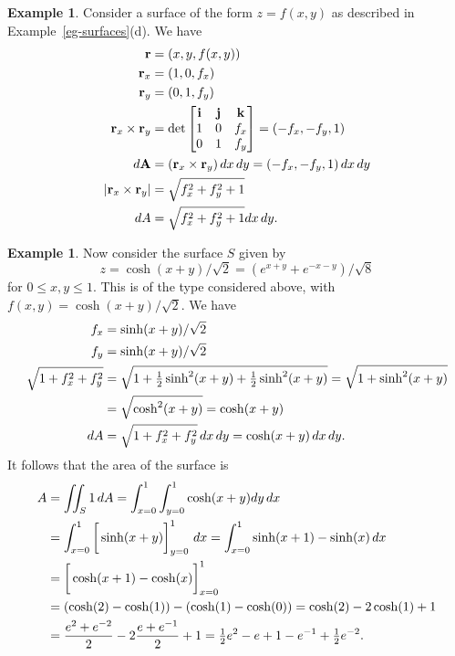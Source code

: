 \documentclass[reqno]{amsart}
\theoremstyle{definition}
\newtheorem{example}[theorem]{Example}
\begin{document}
\begin{example}\label{eg-graph-area}
 Consider a surface of the form $z=f(x,y)$ as described in
 Example~\ref{eg-surfaces}(d).  We have
 \begin{align*}
  \mathbf{r} &= (x,y,f(x,y)) \\
  \mathbf{r}_x &= (1,0,f_x) \\
  \mathbf{r}_y &= (0,1,f_y) \\
  \mathbf{r}_x\times\mathbf{r}_y &= 
   \det\left[\begin{matrix} \mathbf{i} & \mathbf{j} & \mathbf{k} \\
     1 & 0 & f_x \\
     0 & 1 & f_y  
   \end{matrix}\right] = (-f_x,-f_y,1) \\
  d\mathbf{A} &= (\mathbf{r}_x\times\mathbf{r}_y)\,dx\,dy = (-f_x,-f_y,1)\,dx\,dy \\
  |\mathbf{r}_x\times\mathbf{r}_y| &= \sqrt{f_x^2+f_y^2+1} \\
  dA &= \sqrt{f_x^2+f_y^2+1} dx\,dy.
 \end{align*}
\end{example}
\begin{example}
 Now consider the surface $S$ given by 
 \[ z=\cosh(x+y)/\sqrt{2} = (e^{x+y}+e^{-x-y})/\sqrt{8} \] for
 $0\leq x,y\leq 1$.  This is of the type considered above, with
 $f(x,y)=\cosh(x+y)/\sqrt{2}$.  We have
 \begin{align*}
  f_x &= \sinh(x+y)/\sqrt{2} \\
  f_y &= \sinh(x+y)/\sqrt{2} \\
  \sqrt{1+f_x^2+f_y^2} 
   &= \sqrt{1+\tfrac{1}{2}\sinh^2(x+y)+\tfrac{1}{2}\sinh^2(x+y)}
    = \sqrt{1+\sinh^2(x+y)} \\
   &= \sqrt{\cosh^2(x+y)} = \cosh(x+y) \\
  dA &= \sqrt{1+f_x^2+f_y^2}\,dx\,dy = \cosh(x+y)\,dx\,dy.
 \end{align*}
 It follows that the area of the surface is 
 \begin{align*}
  A &= \iint_S 1\,dA 
     = \int_{x=0}^1 \int_{y=0}^1 \cosh(x+y) dy\,dx \\
    &= \int_{x=0}^1\CH{\sinh(x+y)}_{y=0}^1\,dx 
     = \int_{x=0}^1\sinh(x+1)-\sinh(x) \,dx \\
    &= \CH{\cosh(x+1)-\cosh(x)}_{x=0}^1 \\
    &= (\cosh(2)-\cosh(1))-(\cosh(1)-\cosh(0)) 
     = \cosh(2)-2\cosh(1)+1 \\
    &= \frac{e^2+e^{-2}}{2} - 2\frac{e+e^{-1}}{2} + 1
     = \half e^2-e+1-e^{-1}+\half e^{-2}.
 \end{align*}
\end{example}
\end{document}
